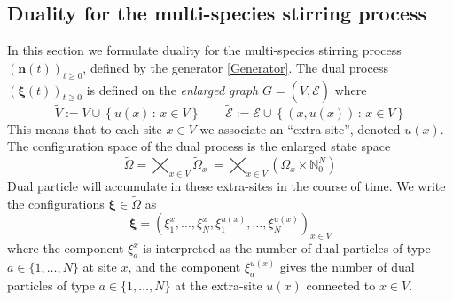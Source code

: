 \documentclass[11pt]{article}
\numberwithin{equation}{section}
\numberwithin{equation}{subsection}
\begin{document}
\subsection{Duality for the multi-species stirring process}\label{statementDualitySubsection}
In this section we formulate duality for the multi-species stirring process $(\bm{n}(t))_{t\geq 0}$, defined by the generator \eqref{Generator}.
The dual  process $(\bm{\xi}(t))_{t\geq 0}$ is defined on the \textit{enlarged graph} $\widetilde{G}=(\widetilde{V},\widetilde{\mathcal{E}})$ where 
\begin{equation}
	\widetilde{V}:=V\cup \left\{u(x)\,:\, x\in V\right\}\qquad \widetilde{\mathcal{E}}:=\mathcal{E}\cup \left\{(x,u(x))\,:\, x\in V\right\}
\end{equation}
This means that to each site $x\in V$ we associate an ``extra-site'', denoted $u(x)$. The configuration space of the dual process is the enlarged state space
\begin{equation}\label{dualStateSpace}
    \widetilde{\Omega}= \bigtimes_{x\in V} \widetilde{\Omega}_{x}\ = \bigtimes_{x\in V} (\Omega_{x}\times \mathbb{N}_{0}^{N})
\end{equation}
Dual particle will accumulate in these extra-sites in the course of time. We write the configurations $\bm{\xi} \in \widetilde\Omega$  as
\begin{equation}
    \bm{\xi}=\left(\xi_{1}^{x},\ldots,\xi_{N}^{x},\xi_{1}^{u(x)},\ldots,\xi_{N}^{u(x)}\right)_{x\in V}
\end{equation}
where the component $\xi_{a}^{x}$ is interpreted as the number of dual particles of type $a\in \{1,\ldots,N\}$ at site $x$, 
and the component $\xi_{a}^{u(x)}$  gives the number of dual particles of type $a\in \{1,\ldots,N\}$ at 
the extra-site $u(x)$ connected to $x\in V$.
\end{document}
